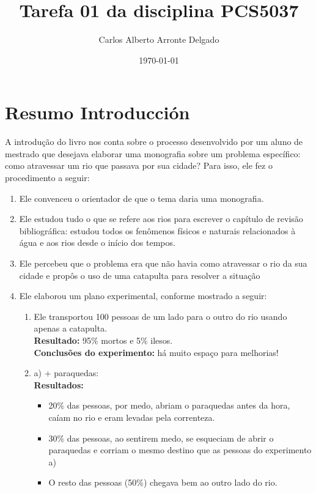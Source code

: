 \documentclass[12pt,a4paper]{article}
\title{Tarefa 01 da disciplina PCS5037}
\author{Carlos Alberto Arronte Delgado}
\date{\today}
\begin{document}
\maketitle



\tableofcontents
\newpage

\section{Resumo Introducción}
A introdução do livro nos conta sobre o processo desenvolvido por um aluno de mestrado que desejava elaborar uma monografia sobre um problema específico: 
como atravessar um rio que passava por sua cidade? Para isso, ele fez o procedimento a seguir:

\begin{enumerate}
    \item Ele convenceu o orientador de que o tema daria uma monografia.
    \item Ele estudou tudo o que se refere aos rios para escrever o capítulo de revisão bibliográfica: 
    estudou todos os fenômenos físicos e naturais relacionados à água e aos rios desde o início dos tempos.    
    \item Ele percebeu que o problema era que não havia como atravessar o rio da sua cidade e propôs o uso de uma catapulta para resolver a situação
    \item Ele elaborou um plano experimental, conforme mostrado a seguir:
    \begin{enumerate}[label=\alph*)]
        \item Ele transportou 100 pessoas de um lado para o outro do rio usando apenas a catapulta. \\
        \textbf{Resultado:} 95\% mortos e 5\% ilesos.\\ 
        \textbf{Conclusões do experimento:} há muito espaço para melhorias!
        \item a) + paraquedas:\\
        \textbf{Resultados:} 
                \begin{itemize}
                    \item 20\% das pessoas, por medo, abriam o paraquedas antes da hora, caíam no rio e eram levadas pela correnteza.
                    \item 30\% das pessoas, ao sentirem medo, se esqueciam de abrir o paraquedas e corriam o mesmo destino que as pessoas do experimento a)
                    \item O resto das pessoas (50\%) chegava bem ao outro lado do rio.

\end{itemize}
\end{enumerate}
\end{enumerate}
\end{document}
